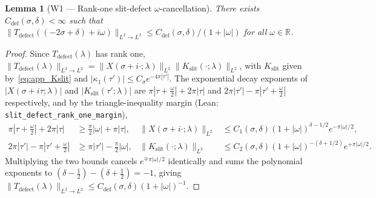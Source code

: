 \documentclass[11pt,a4paper]{article}
\newtheorem{lem}{Lemma}[section]
\begin{document}
\begin{lem}[W1 --- Rank-one slit-defect $\omega$-cancellation]\label{lem:app_defect}
There exists $C_{\mathrm{def}}(\sigma,\delta)<\infty$ such that
$\|T_{\mathrm{defect}}((-2\sigma+\delta)+i\omega)\|_{L^2\to L^2}\le C_{\mathrm{def}}(\sigma,\delta)/(1+|\omega|)$ for all $\omega\in\mathbb{R}$.
\end{lem}
\begin{proof}
Since $T_{\mathrm{defect}}(\lambda)$ has rank one,
$\|T_{\mathrm{defect}}(\lambda)\|_{L^2\to L^2}=\|X(\sigma+i\cdot;\lambda)\|_{L^2}\|K_{\mathrm{slit}}(\cdot;\lambda)\|_{L^2}$,
with $K_{\mathrm{slit}}$ given by~\eqref{eq:app_Kslit} and $|\kappa_1(\tau')|\le C_\sigma e^{-4\pi|\tau'|}$.
The exponential decay exponents of $|X(\sigma+i\tau;\lambda)|$ and $|K_{\mathrm{slit}}(\tau';\lambda)|$ are
$\pi|\tau+\tfrac{\omega}{2}|+2\pi|\tau|$ and $2\pi|\tau'|-\pi|\tau'+\tfrac{\omega}{2}|$ respectively, and
by the triangle-inequality margin (Lean: \texttt{slit\_defect\_\allowbreak rank\_one\_margin}),
\begin{align*}
\pi|\tau+\tfrac{\omega}{2}| + 2\pi|\tau| &\ge \tfrac{\pi}{2}|\omega| + \pi|\tau|,
  & \|X(\sigma+i\cdot;\lambda)\|_{L^2} &\le C_1(\sigma,\delta)(1+|\omega|)^{\delta-1/2}e^{-\pi|\omega|/2}, \\
2\pi|\tau'| - \pi|\tau'+\tfrac{\omega}{2}| &\ge \pi|\tau'| - \tfrac{\pi}{2}|\omega|,
  & \|K_{\mathrm{slit}}(\cdot;\lambda)\|_{L^2} &\le C_2(\sigma,\delta)(1+|\omega|)^{-(\delta+1/2)}e^{+\pi|\omega|/2}.
\end{align*}
Multiplying the two bounds cancels $e^{\mp\pi|\omega|/2}$ identically and sums the polynomial exponents to
$(\delta-\tfrac12)-(\delta+\tfrac12)=-1$, giving $\|T_{\mathrm{defect}}(\lambda)\|_{L^2\to L^2}\le C_{\mathrm{def}}(\sigma,\delta)(1+|\omega|)^{-1}$.
\end{proof}
\end{document}
